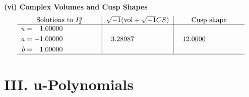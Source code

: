 \documentclass[1p]{elsarticle_modified}
\theoremstyle{definition}
\newcommand{\I}{\sqrt{-1}}
\begin{document}
\newpage\flushleft \textbf{(vi) Complex Volumes and Cusp Shapes}
$$\begin{array}{c|c|c}  
\text{Solutions to }I^u_{2}& \I (\text{vol} + \sqrt{-1}CS) & \text{Cusp shape}\\
 \hline 
\begin{aligned}
u &= \phantom{-}1.00000\phantom{ +0.000000I} \\
a &= -1.00000\phantom{ +0.000000I} \\
b &= \phantom{-}1.00000\phantom{ +0.000000I}\end{aligned}
 & \phantom{-}3.28987\phantom{ +0.000000I} & \phantom{-}12.0000\phantom{ +0.000000I}\\
 \hline 
 \end{array}$$\newpage
\newpage\renewcommand{\arraystretch}{1}
\centering \section*{ III. u-Polynomials}
\end{document}
